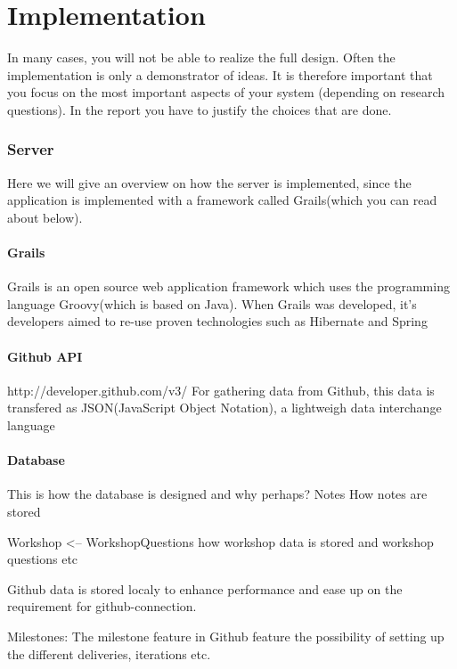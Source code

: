 \chapter{Implementation}
In many cases, you will not be able to realize the full design. Often the implementation is only a demonstrator of ideas. 
It is therefore important that you focus on the most important aspects of your system (depending on research questions). 
In the report you have to justify the choices that are done.

\subsection{Server}
Here we will give an overview on how the server is implemented, since the application is implemented with a framework called Grails(which you can read about below).

\subsubsection{Grails}
Grails is an open source web application framework which uses the programming language Groovy(which is based on Java). When Grails was developed, it's developers aimed to re-use proven technologies such as Hibernate and Spring 

\subsubsection{Github API}
http://developer.github.com/v3/
For gathering data from Github, this data is transfered as JSON(JavaScript Object Notation), a lightweigh data interchange language

\subsubsection{Database}

This is how the database is designed and why perhaps?
Notes
How notes are stored

Workshop <-- WorkshopQuestions
how workshop data is stored and workshop questions etc

Github data is stored localy to enhance performance and ease up on the requirement for github-connection.

Milestones:
The milestone feature in Github feature the possibility of setting up the different deliveries, iterations etc.

